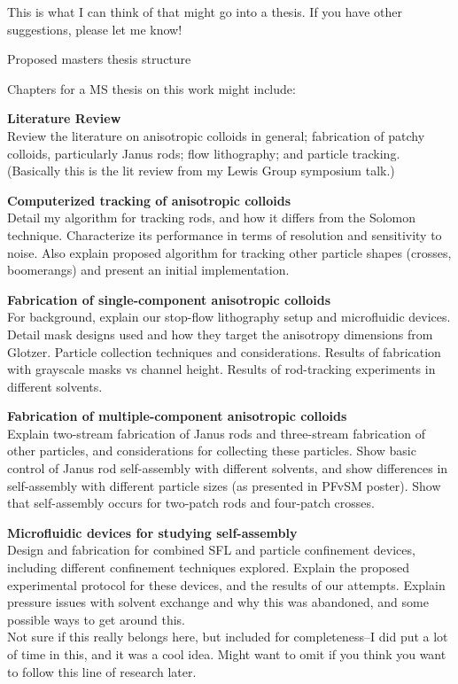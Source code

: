 \documentclass[11pt]{article}
\newcommand{\bigsection}[1]{	
	\vspace{4pt}
	{\fontfamily{phv}\selectfont\Large#1}

}
\begin{document}
This is what I can think of that might go into a thesis.  If you have other suggestions, please let me know!

\pagebreak

\bigsection{Proposed masters thesis structure}

Chapters for a MS thesis on this work might include:

\textbf{Literature Review}\\
Review the literature on anisotropic colloids in general; fabrication of patchy colloids, particularly Janus rods; flow lithography; and particle tracking. (Basically this is the lit review from my Lewis Group symposium talk.)

\textbf{Computerized tracking of anisotropic colloids}\\
Detail my algorithm for tracking rods, and how it differs from the Solomon technique. Characterize its performance in terms of resolution and sensitivity to noise. Also explain proposed algorithm for tracking other
particle shapes (crosses, boomerangs) and present an initial implementation.

\textbf{Fabrication of single-component anisotropic colloids}\\
For background, explain our stop-flow lithography setup and microfluidic devices. Detail mask designs used and how they target the anisotropy dimensions from Glotzer. Particle collection techniques and considerations. 
Results of fabrication with grayscale masks vs channel height. Results of rod-tracking experiments in different solvents.

\textbf{Fabrication of multiple-component anisotropic colloids}\\
Explain two-stream fabrication of Janus rods and three-stream fabrication of other particles, and considerations for collecting these particles. Show basic control of Janus rod self-assembly with different solvents, and 
show differences in self-assembly with different particle sizes (as presented in PFvSM poster).  Show that self-assembly occurs for two-patch rods and four-patch crosses.

\textbf{Microfluidic devices for studying self-assembly}\\
Design and fabrication for combined SFL and particle confinement devices, including different confinement techniques explored.  Explain the proposed experimental protocol for these devices, and the results of our attempts.
Explain pressure issues with solvent exchange and why this was abandoned, and some possible ways to get around this.\\
Not sure if this really belongs here, but included for completeness--I did put a lot of time in this, and it was a cool idea.  Might want to omit if you think you want to follow this line of research later.
\end{document}
